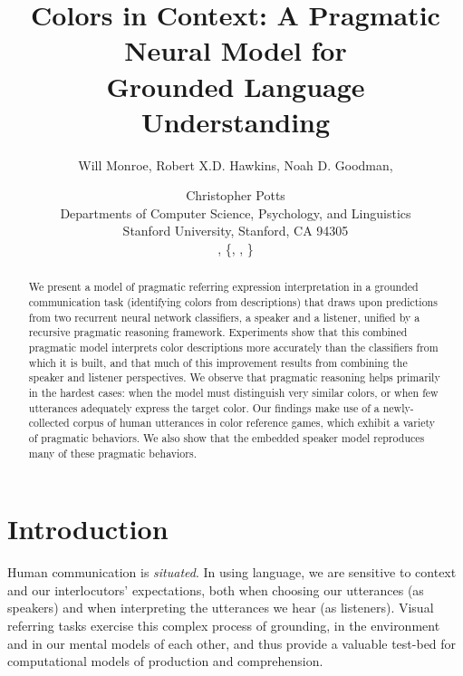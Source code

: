 \documentclass[11pt,letterpaper]{article}
\title{Colors in Context: A Pragmatic Neural Model for \\
Grounded Language Understanding}
\author{
Will Monroe,\authmark{1}\;
Robert X.D. Hawkins,\authmark{2}\;
Noah D. Goodman,\authmark{1,2}
\and Christopher Potts\authmark{3} \\
Departments of \authmark{1}Computer Science, \authmark{2}Psychology, and \authmark{3}Linguistics \\
Stanford University, Stanford, CA 94305 \\
\email{wmonroe4@cs.stanford.edu}, \{\email{rxdh}, \email{ngoodman}, \email{cgpotts}\}\email{@stanford.edu}
}
\date{}
\renewcommand{\|}{\mid}
\begin{document}
\maketitle
\begin{abstract}


We present a model of pragmatic referring expression interpretation
 in a grounded communication task
(identifying colors from descriptions) that draws upon predictions
from two recurrent neural network classifiers, a speaker and a listener,
unified by a recursive pragmatic reasoning framework.
Experiments show that this
combined pragmatic model interprets color descriptions
more accurately than the classifiers from which it is built, and that
much of this improvement results from combining the speaker and listener
perspectives.
We observe that pragmatic reasoning helps primarily
in the hardest cases: when the model must distinguish very similar colors,
or when few utterances adequately express
the target color.
Our findings make use of a newly-collected corpus of human utterances in
color reference games, which exhibit a variety of pragmatic behaviors.
We also show that the embedded speaker model reproduces many of these
 pragmatic behaviors.

\end{abstract}

\section{Introduction} \label{sec:intro}


Human communication is \emph{situated}. In using language, we are sensitive
to context and our interlocutors' expectations, both when choosing our
utterances (as speakers) and when interpreting the utterances we hear (as listeners).
Visual referring tasks exercise this complex process of grounding,
in the environment and in
our mental models of each other, and thus provide a valuable test-bed for
computational models of production and comprehension.
\end{document}
